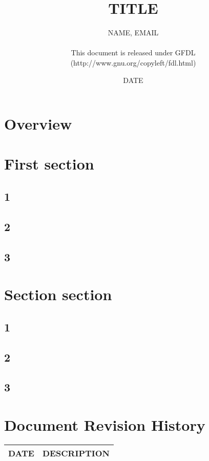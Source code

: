 \documentclass{article}
\title{TITLE}
\author{NAME, EMAIL\\
	\\
	This document is released under GFDL\\ 
	(http://www.gnu.org/copyleft/fdl.html)}
\date{DATE}
\begin{document}
\maketitle
\newpage

\tableofcontents
\newpage


\section{Overview}
\section{First section}
\subsection{1}
\subsection{2}
\subsection{3}

\section{Section section}
\subsection{1}
\subsection{2}
\subsection{3}


\newpage
\section{Document Revision History}

\begin{table}[h]
\begin{tabular}{|l|l|} \hline
DATE & DESCRIPTION \\ \hline

\end{tabular}
\end{table}
\end{document}
